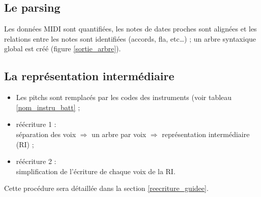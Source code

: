 %

\subsection*{Le parsing}
Les données MIDI sont quantifiées, les notes de dates proches sont alignées et
les relations entre les notes sont identifiées (accords, fla, etc…) ; un arbre
syntaxique global est créé (figure \ref{sortie_arbre}). 

\subsection*{La représentation intermédiaire}
\label{regles}
\begin{itemize}
    \item Les pitchs sont remplacés par les codes des instruments (voir tableau
    \ref{nom_instru_batt} ;
    \item réécriture 1 :\\
    séparation des voix $\Rightarrow$ un arbre par voix
    $\Rightarrow$ représentation intermédiaire (RI) ;
    \item réécriture 2 :\\
    simplification de l’écriture de chaque voix de la RI.\\
\end{itemize}
Cette procédure sera détaillée dans la section \ref{reecriture_guidee}.

